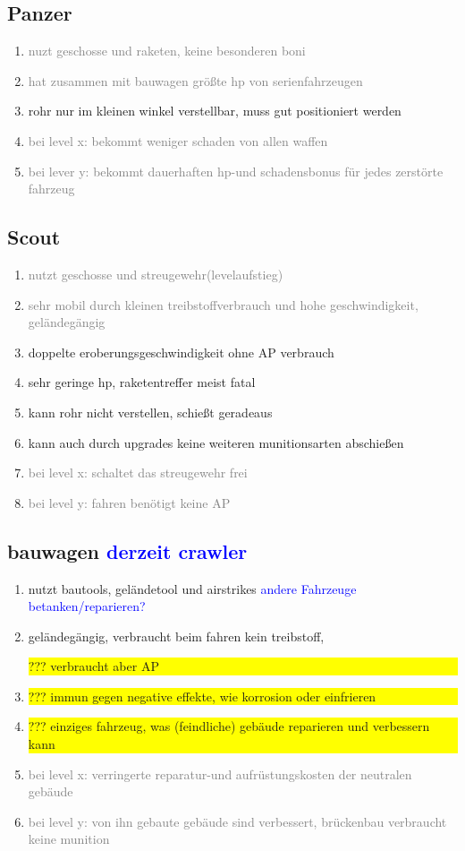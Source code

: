 \documentclass[10pt,a4paper,final]{scrartcl}
\newcommand{\ueberdenken}[1]{\colorbox{yellow}{\parbox{\textwidth}{??? #1}}}
\newcommand{\unwichtig}[1]{\textcolor{gray}{#1}}
\newcommand{\notiz}[1]{\textcolor{blue}{#1}}
\begin{document}
\subsection{Panzer}
\begin{enumerate}
\item \unwichtig{nuzt geschosse und raketen, keine besonderen boni}
\item \unwichtig{hat zusammen mit bauwagen größte hp von serienfahrzeugen}
\item rohr nur im kleinen winkel verstellbar, muss gut positioniert werden
\item \unwichtig{bei level x: bekommt weniger schaden von allen waffen}
\item \unwichtig{bei lever y: bekommt dauerhaften hp-und schadensbonus für jedes zerstörte fahrzeug}
\end{enumerate}

\subsection{Scout}
\begin{enumerate}
\item \unwichtig{nutzt geschosse und streugewehr(levelaufstieg)}
\item \unwichtig{sehr mobil durch kleinen treibstoffverbrauch und hohe geschwindigkeit, geländegängig}
\item doppelte eroberungsgeschwindigkeit ohne AP verbrauch
\item sehr geringe hp, raketentreffer meist fatal
\item kann rohr nicht verstellen, schießt geradeaus
\item kann auch durch upgrades keine weiteren munitionsarten abschießen
\item \unwichtig{bei level x: schaltet das streugewehr frei}
\item \unwichtig{bei level y: fahren benötigt keine AP}
\end{enumerate}

\subsection{bauwagen \notiz{derzeit crawler}}
\begin{enumerate}
\item nutzt bautools, geländetool und airstrikes \notiz{andere Fahrzeuge betanken/reparieren?}
\item geländegängig, verbraucht beim fahren kein treibstoff, \ueberdenken{verbraucht aber AP}
\item \ueberdenken{immun gegen negative effekte, wie korrosion oder einfrieren}
\item \ueberdenken{ einziges fahrzeug, was (feindliche) gebäude reparieren und verbessern kann}
\item \unwichtig{bei level x: verringerte reparatur-und aufrüstungskosten der neutralen gebäude}
\item \unwichtig{bei level y: von ihn gebaute gebäude sind verbessert, brückenbau verbraucht keine munition}
\end{enumerate}
\end{document}
